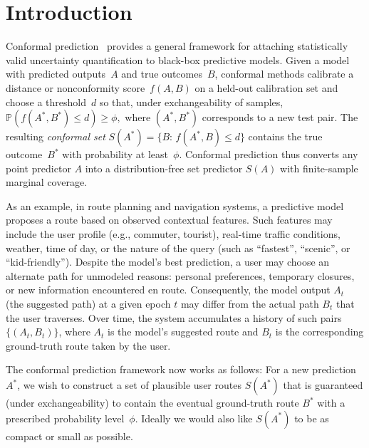 \section{Introduction}

Conformal prediction~\cite{vovk2005algorithmic,shafer2008tutorial,angelopoulos2021gentle}
provides a general framework for attaching statistically valid uncertainty
quantification to black-box predictive models.  Given a model with predicted outputs~$A$ and true outcomes~$B$, conformal methods calibrate a distance
or nonconformity score~$f(A,B)$ on a held-out calibration set and choose a
threshold~$d$ so that, under exchangeability of samples, $
  \mathbb{P}(f(A^*,B^*)\le d) \ge \phi ,$ where $(A^*,B^*)$ corresponds to a new test pair.  The resulting
\emph{conformal set} $
  S(A^*) = \{B:\,f(A^*,B)\le d\}
$
contains the true outcome~$B^*$ with probability at least~$\phi$.
Conformal prediction thus converts any point predictor $A$ into a distribution-free set predictor $S(A)$ with finite-sample marginal coverage.


As an example, in  route planning and navigation systems, a predictive model proposes a route based on observed contextual features. Such features may include the user profile (e.g., commuter, tourist), real-time traffic conditions, weather, time of day, or the nature of the query (such as ``fastest'', ``scenic'', or ``kid-friendly'').  Despite the model's best prediction, a user may choose an alternate path for unmodeled reasons: personal preferences, temporary closures, or new information encountered en route.  Consequently, the model output $A_t$ (the suggested path) at a given epoch $t$ may differ from the actual path $B_t$ that the user traverses.  Over time, the system accumulates a history of such pairs
$\{(A_t,B_t)\}$, where $A_t$ is the model's suggested route and $B_t$ is the corresponding ground-truth route taken by the user.

The conformal prediction framework now works as follows:  For a new prediction $A^*$, we wish to construct a set of plausible user routes $S(A^*)$ that is guaranteed (under exchangeability) to contain the eventual ground-truth route $B^*$ with a prescribed probability level~$\phi$. 
Ideally we would also like $S(A^*)$ to be as compact or small as possible. 

